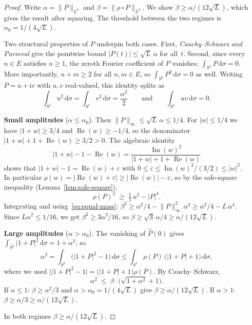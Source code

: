 \documentclass[11pt]{amsart}
\theoremstyle{definition}
\theoremstyle{remark}
\newcommand{\abs}[1]{\lvert #1 \rvert}
\newcommand{\norm}[1]{\lVert #1 \rVert}
\DeclareMathOperator{\re}{Re}
\DeclareMathOperator{\im}{Im}
\newcommand{\dd}{\mathrm{d}}
\newcommand{\ii}{\mathrm{i}}
\newcommand{\rhoFn}{\rho}
\begin{document}
\begin{proof}
Write $\alpha = \norm{P}_{L^2}$ and $\beta = \norm{\rhoFn \circ P}_{L^2}$.
We show $\beta \ge \alpha/(12\sqrt{L})$, which gives the result after
squaring.  The threshold between the two regimes is
$\alpha_0 = 1/(4\sqrt{L})$.

Two structural properties of $P$ underpin both cases.  First,
\emph{Cauchy--Schwarz and Parseval} give the pointwise bound
$\abs{P(t)} \le \sqrt{L}\, \alpha$ for all~$t$.
Second, since every $n \in E$ satisfies $n \ge 1$, the zeroth Fourier
coefficient of $P$ vanishes:
$\int_{S^1} P\,\dd\sigma = 0$.
More importantly, $n + m \ge 2$ for all $n, m \in E$, so
$\int_{S^1} P^2\,\dd\sigma = 0$ as well.  Writing $P = u + \ii v$ with
$u, v$ real-valued, this identity splits as
\begin{equation}\label{eq:equal-mass}
\int_{S^1} u^2\,\dd\sigma
= \int_{S^1} v^2\,\dd\sigma
= \frac{\alpha^2}{2}
\qquad\text{and}\qquad
\int_{S^1} uv\,\dd\sigma = 0.
\end{equation}

\medskip
\noindent
\textbf{Small amplitudes} ($\alpha \le \alpha_0$).
Then $\norm{P}_\infty \le \sqrt{L}\,\alpha \le 1/4$.  For $\abs{w} \le 1/4$
we have $\abs{1+w} \ge 3/4$ and $\re(w) \ge -1/4$, so the denominator
$\abs{1+w} + 1 + \re(w) \ge 3/2 > 0$.  The algebraic identity
\[
\abs{1+w} - 1 - \re(w)
= \frac{\im(w)^2}{\abs{1+w} + 1 + \re(w)}
\]
shows that $\abs{1+w} - 1 = \re(w) + \varepsilon$ with
$0 \le \varepsilon \le \im(w)^2/(3/2) \le \abs{w}^2$.  In particular
$\rhoFn(w) = \bigl\lvert \re(w) + \varepsilon\bigr\rvert \ge
\abs{\re(w)} - \varepsilon$, so by the safe-square inequality
(Lemma~\ref{lem:safe-square}),
\[
\rhoFn(P)^2 \;\ge\; \tfrac{1}{2}\, u^2 - \abs{P}^4.
\]
Integrating and using~\eqref{eq:equal-mass}:
$\beta^2 \ge \alpha^2/4 - \norm{P}_\infty^2\, \alpha^2 \ge \alpha^2/4 - L\,\alpha^4$.
Since $L\alpha^2 \le 1/16$, we get $\beta^2 \ge 3\alpha^2/16$, so
$\beta \ge \sqrt{3}\,\alpha/4 \ge \alpha/(12\sqrt{L})$.

\medskip
\noindent
\textbf{Large amplitudes} ($\alpha > \alpha_0$).
The vanishing of $\hat P(0)$ gives
$\int_{S^1}\abs{1+P}^2\,\dd\sigma = 1 + \alpha^2$, so
\[
\alpha^2
= \int_{S^1}\bigl(\abs{1+P}^2 - 1\bigr)\,\dd\sigma
\le \int_{S^1} \rhoFn(P)\,\bigl(\abs{1+P} + 1\bigr)\,\dd\sigma,
\]
where we used $\bigl\lvert \abs{1+P}^2 - 1\bigr\rvert
= \bigl(\abs{1+P} + 1\bigr)\rhoFn(P)$.  By Cauchy--Schwarz,
\[
\alpha^2 \;\le\; \beta \cdot \bigl(\sqrt{1+\alpha^2} + 1\bigr).
\]
If $\alpha \le 1$: $\beta \ge \alpha^2/3$ and $\alpha > \alpha_0 = 1/(4\sqrt{L})$ give
$\beta \ge \alpha/(12\sqrt{L})$.
If $\alpha > 1$: $\beta \ge \alpha/3 \ge \alpha/(12\sqrt{L})$.

\medskip
In both regimes $\beta \ge \alpha/(12\sqrt{L})$.
\end{proof}
\end{document}
